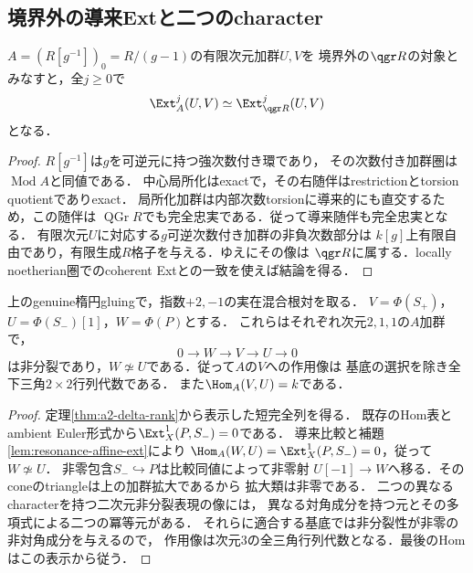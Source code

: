 \subsection{境界外の導来Extと二つのcharacter}
\begin{lemma}[中心局所化による導来Extの保存]
\label{lem:resonance-affine-ext}
$A=(R[g^{-1}])_0=R/(g-1)$の有限次元加群$U,V$を
境界外の$\qgr R$の対象とみなすと，全$j\ge0$で
\[
\Ext^j_A(U,V)\simeq\Ext^j_{\qgr R}(U,V)
\]
となる．
\end{lemma}
\begin{proof}
$R[g^{-1}]$は$g$を可逆元に持つ強次数付き環であり，
その次数付き加群圏は$\operatorname{Mod}A$と同値である．
中心局所化はexactで，その右随伴はrestrictionとtorsion quotientでありexact．
局所化加群は内部次数torsionに導来的にも直交するため，この随伴は
$\operatorname{QGr}R$でも完全忠実である．従って導来随伴も完全忠実となる．
有限次元$U$に対応する$g$可逆次数付き加群の非負次数部分は
$k[g]$上有限自由であり，有限生成$R$格子を与える．ゆえにその像は
$\qgr R$に属する．locally noetherian圏でのcoherent Extとの一致を使えば結論を得る．
\end{proof}

\begin{theorem}[混合$A_2$のcharacter分離と非分裂三角表現]
\label{thm:resonance-affine-triangular}
上のgenuine楕円gluingで，指数$+2,-1$の実在混合根対を取る．
$V=\Phi(S_+)$，$U=\Phi(S_-)[1]$，$W=\Phi(P)$とする．
これらはそれぞれ次元$2,1,1$の$A$加群で，
\[
0\longrightarrow W\longrightarrow V\longrightarrow U\longrightarrow0
\]
は非分裂であり，$W\not\simeq U$である．従って$A$の$V$への作用像は
基底の選択を除き全下三角$2\times2$行列代数である．
また$\Hom_A(V,U)=k$である．
\end{theorem}
\begin{proof}
定理\ref{thm:a2-delta-rank}から表示した短完全列を得る．
既存のHom表とambient Euler形式から$\Ext_X^1(P,S_-)=0$である．
導来比較と補題\ref{lem:resonance-affine-ext}により
$\Hom_A(W,U)=\Ext_X^1(P,S_-)=0$，従って$W\not\simeq U$．
非零包含$S_-\hookrightarrow P$は比較同値によって非零射
$U[-1]\to W$へ移る．そのconeのtriangleは上の加群拡大であるから
拡大類は非零である．
二つの異なるcharacterを持つ二次元非分裂表現の像には，
異なる対角成分を持つ元とその多項式による二つの冪等元がある．
それらに適合する基底では非分裂性が非零の非対角成分を与えるので，
作用像は次元3の全三角行列代数となる．最後のHomはこの表示から従う．
\end{proof}

